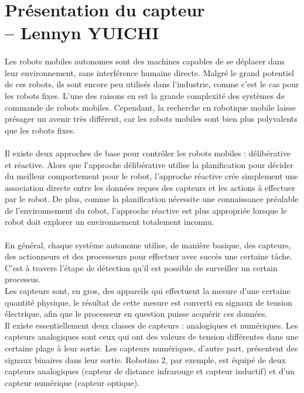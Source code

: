 \documentclass[oneside,a4paper,12pt]{article}
\begin{document}
	\section{Présentation du capteur\\ -- Lennyn YUICHI}
	\paragraph{}
	Les robots mobiles autonomes sont des machines capables de se déplacer dans leur environnement, sans interférence humaine directe. Malgré le grand potentiel de ces robots, ils sont encore peu utilisés dans l'industrie, comme c'est le cas pour les robots fixes. L'une des raisons en est la grande complexité des systèmes de commande de robots mobiles. Cependant, la recherche en robotique mobile laisse présager un avenir très différent, car les robots mobiles sont bien plus polyvalents que les robots fixes.
	\paragraph{}
	Il existe deux approches de base pour contrôler les robots mobiles : délibérative et réactive. Alors que l'approche délibérative utilise la planification pour décider du meilleur comportement pour le robot, l'approche réactive crée simplement une association directe entre les données reçues des capteurs et les actions à effectuer par le robot. De plus, comme la planification nécessite une connaissance préalable de l'environnement du robot, l'approche réactive est plus appropriée lorsque le robot doit explorer un environnement totalement inconnu.\\
	\paragraph{}
	En général, chaque système autonome utilise, de manière basique, des capteurs, des actionneurs et des processeurs pour effectuer avec succès une certaine tâche. C'est à travers l'étape de détection qu'il est possible de surveiller un certain processus.\\
	Les capteurs sont, en gros, des appareils qui effectuent la mesure d'une certaine quantité physique, le résultat de cette mesure est converti en signaux de tension électrique, afin que le processeur en question puisse acquérir ces données.\\
	Il existe essentiellement deux classes de capteurs : analogiques et numériques. Les capteurs analogiques sont ceux qui ont des valeurs de tension différentes dans une certaine plage à leur sortie. Les capteurs numériques, d'autre part, présentent des signaux binaires dans leur sortie. Robotino 2, par exemple, est équipé de deux capteurs analogiques (capteur de distance infrarouge et capteur inductif) et d'un capteur numérique (capteur optique).\\
	
\end{document}
